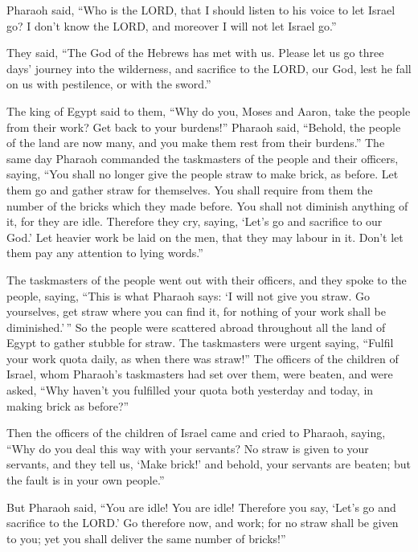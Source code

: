  Pharaoh said, ``Who is the LORD, that I should listen to
his voice to let Israel go? I don't know the LORD, and moreover I will
not let Israel go.''

 They said, ``The God of the Hebrews has met with us. Please
let us go three days' journey into the wilderness, and sacrifice to the
LORD, our God, lest he fall on us with pestilence, or with the sword.''

 The king of Egypt said to them, ``Why do you, Moses and
Aaron, take the people from their work? Get back to your burdens!''
 Pharaoh said, ``Behold, the people of the land are now
many, and you make them rest from their burdens.''  The same
day Pharaoh commanded the taskmasters of the people and their officers,
saying,  ``You shall no longer give the people straw to make
brick, as before. Let them go and gather straw for themselves.
 You shall require from them the number of the bricks which
they made before. You shall not diminish anything of it, for they are
idle. Therefore they cry, saying, `Let's go and sacrifice to our God.'
 Let heavier work be laid on the men, that they may labour
in it. Don't let them pay any attention to lying words.''

 The taskmasters of the people went out with their
officers, and they spoke to the people, saying, ``This is what Pharaoh
says: `I will not give you straw.  Go yourselves, get straw
where you can find it, for nothing of your work shall be
diminished.'\,''  So the people were scattered abroad
throughout all the land of Egypt to gather stubble for straw.
 The taskmasters were urgent saying, ``Fulfil your work
quota daily, as when there was straw!''  The officers of
the children of Israel, whom Pharaoh's taskmasters had set over them,
were beaten, and were asked, ``Why haven't you fulfilled your quota both
yesterday and today, in making brick as before?''

 Then the officers of the children of Israel came and cried
to Pharaoh, saying, ``Why do you deal this way with your servants?
 No straw is given to your servants, and they tell us,
`Make brick!' and behold, your servants are beaten; but the fault is in
your own people.''

 But Pharaoh said, ``You are idle! You are idle! Therefore
you say, `Let's go and sacrifice to the LORD.'  Go
therefore now, and work; for no straw shall be given to you; yet you
shall deliver the same number of bricks!''

